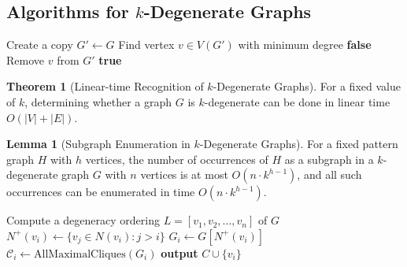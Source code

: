 \documentclass{article}
\theoremstyle{definition}
\newtheorem{theorem}{Theorem}
\newtheorem{lemma}{Lemma}
\begin{document}
\subsection{Algorithms for $k$-Degenerate Graphs}

\begin{algorithm}
\caption{Recognition of $k$-Degenerate Graphs}
\label{alg:k-degen-recognition}
\begin{algorithmic}[1]
        \State Create a copy $G' \gets G$
            \State Find vertex $v \in V(G')$ with minimum degree
                \State \Return \textbf{false} 
            \EndIf
            \State Remove $v$ from $G'$
        \EndWhile
        \State \Return \textbf{true} 
    \EndProcedure
\end{algorithmic}
\end{algorithm}

\begin{theorem}[Linear-time Recognition of $k$-Degenerate Graphs]
For a fixed value of $k$, determining whether a graph $G$ is $k$-degenerate can be done in linear time $O(|V| + |E|)$.
\end{theorem}

\begin{lemma}[Subgraph Enumeration in $k$-Degenerate Graphs]
For a fixed pattern graph $H$ with $h$ vertices, the number of occurrences of $H$ as a subgraph in a $k$-degenerate graph $G$ with $n$ vertices is at most $O(n \cdot k^{h-1})$, and all such occurrences can be enumerated in time $O(n \cdot k^{h-1})$.
\end{lemma}

\begin{algorithm}
\caption{Enumeration of Maximal Cliques in $k$-Degenerate Graphs}
\label{alg:enumerate-maximal-cliques}
\begin{algorithmic}[1]
        \State Compute a degeneracy ordering $L = [v_1, v_2, \ldots, v_n]$ of $G$
            \State $N^+(v_i) \gets \{v_j \in N(v_i) : j > i\}$ 
            \State $G_i \gets G[N^+(v_i)]$ 
            \State $\mathcal{C}_i \gets \text{AllMaximalCliques}(G_i)$ 
                \State \textbf{output} $C \cup \{v_i\}$ 
            \EndFor
        \EndFor
    \EndProcedure
\end{algorithmic}
\end{algorithm}
\end{document}
